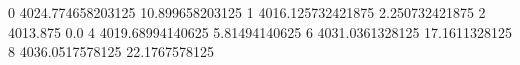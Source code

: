0 4024.774658203125 10.899658203125
1 4016.125732421875 2.250732421875
2 4013.875 0.0
4 4019.68994140625 5.81494140625
6 4031.0361328125 17.1611328125
8 4036.0517578125 22.1767578125
